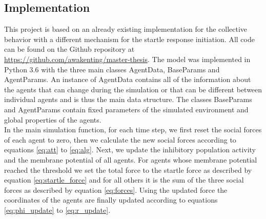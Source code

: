 	\subsection{Implementation}
	This project is based on an already existing implementation for the collective behavior with a different mechanism for the startle response initiation.
    All code can be found on the Github repository at \href{https://github.com/awakenting/master-thesis}{https://github.com/awakenting/master-thesis}.
	The model was implemented in Python 3.6 with the three main classes AgentData, BaseParams and AgentParams.
	An instance of AgentData contains all of the information about the agents that can change during the simulation or that can be different between individual agents and is thus the main data structure.
	The classes BaseParams and AgentParams contain fixed parameters of the simulated environment and global properties of the agents.\\
	In the main simulation function, for each time step, we first reset the social forces of each agent to zero, then we calculate the new social forces according to equations \ref{eq:att} to \ref{eq:alg}.
	Next, we update the inhibitory population activity and the membrane potential of all agents.
	For agents whose membrane potential reached the threshold we set the total force to the startle force as described by equation \ref{eq:startle_force} and for all others it is the sum of the three social forces as described by equation \ref{eq:forces}.
	Using the updated force the coordinates of the agents are finally updated according to equations \ref{eq:phi_update} to \ref{eq:r_update}.
